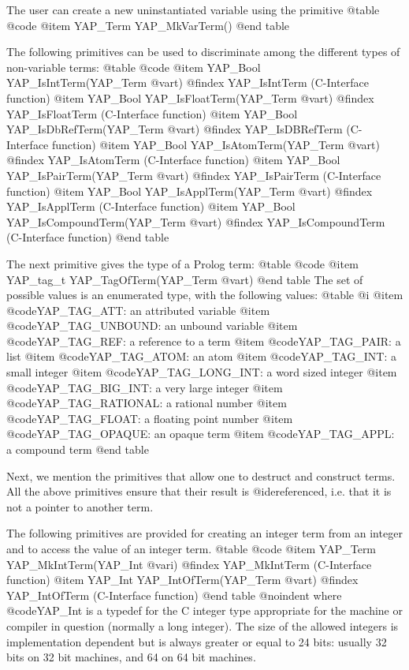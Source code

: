 The user can create a new uninstantiated variable using the primitive
@table @code
 @item     YAP_Term  YAP_MkVarTerm()
@end table


The following primitives can be used to discriminate among the different types
of non-variable terms:
@table @code
@item      YAP_Bool YAP_IsIntTerm(YAP_Term @var{t})
@findex YAP_IsIntTerm (C-Interface function)
@item      YAP_Bool YAP_IsFloatTerm(YAP_Term @var{t})
@findex YAP_IsFloatTerm (C-Interface function)
@item      YAP_Bool YAP_IsDbRefTerm(YAP_Term @var{t})
@findex YAP_IsDBRefTerm (C-Interface function)
@item      YAP_Bool YAP_IsAtomTerm(YAP_Term @var{t})
@findex YAP_IsAtomTerm (C-Interface function)
@item      YAP_Bool YAP_IsPairTerm(YAP_Term @var{t})
@findex YAP_IsPairTerm (C-Interface function)
@item     YAP_Bool YAP_IsApplTerm(YAP_Term @var{t})
@findex YAP_IsApplTerm (C-Interface function)
@item      YAP_Bool YAP_IsCompoundTerm(YAP_Term @var{t})
@findex YAP_IsCompoundTerm (C-Interface function)
@end table


The next primitive gives the type of a Prolog term:
@table @code
@item      YAP_tag_t YAP_TagOfTerm(YAP_Term @var{t})
@end table
The set of possible values is an enumerated type, with the following values:
@table @i
@item  @code{YAP_TAG_ATT}: an attributed variable
@item  @code{YAP_TAG_UNBOUND}: an unbound variable
@item  @code{YAP_TAG_REF}: a reference to a term
@item  @code{YAP_TAG_PAIR}: a list
@item  @code{YAP_TAG_ATOM}: an atom
@item  @code{YAP_TAG_INT}: a small integer
@item  @code{YAP_TAG_LONG_INT}: a word sized integer
@item  @code{YAP_TAG_BIG_INT}: a very large integer
@item  @code{YAP_TAG_RATIONAL}: a rational number
@item  @code{YAP_TAG_FLOAT}: a floating point number
@item  @code{YAP_TAG_OPAQUE}: an opaque term
@item  @code{YAP_TAG_APPL}: a compound term
@end table


Next, we mention the primitives that allow one to destruct and construct
terms. All the above primitives ensure that their result is
@i{dereferenced}, i.e. that it is not a pointer to another term.

The following primitives are provided for creating an integer term from an
integer and to access the value of an integer term.
@table @code
@item      YAP_Term YAP_MkIntTerm(YAP_Int  @var{i})
@findex YAP_MkIntTerm (C-Interface function)
@item     YAP_Int  YAP_IntOfTerm(YAP_Term @var{t})
@findex YAP_IntOfTerm (C-Interface function)
@end table
@noindent
where @code{YAP_Int} is a typedef for the C integer type appropriate for
the machine or compiler in question (normally a long integer). The size
of the allowed integers is implementation dependent but is always
greater or equal to 24 bits: usually 32 bits on 32 bit machines, and 64
on 64 bit machines.

